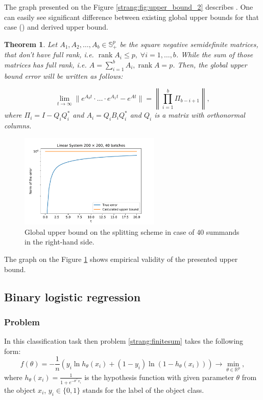\documentclass{article}
\newtheorem{theorem}{Theorem}
\begin{document}
The graph presented on the Figure \ref{strang:fig:upper_bound_2} describes . One can easily see significant difference between existing global upper bounds for that case (\cite{sheng1994global}) and derived upper bound.

\begin{theorem}\label{strang:theorem_uppbound}
	Let $A_1, A_2, \ldots, A_b \in \mathbb{S}^p_{+}$ be the square negative semidefinite matrices, that don't have full rank, i.e. $\operatorname{rank}{A_i} \leq p, \;\forall i = 1, \ldots, b$. While the sum of those matrices has full rank, i.e. $A = \sum\limits_{i=1}^b A_i, \operatorname{rank}{A} = p$. Then, the global upper bound error will be written as follows:

	\begin{equation}\label{strang:global_error_upper_bound}
		\lim_{t \to \infty}\| e^{A_bt} \cdot \ldots \cdot e^{A_1t} - e^{At}\| = \left\|\prod\limits_{i=1}^b \Pi_{b-i+1}\right\|,
	\end{equation}
	where $\Pi_i = I - Q_iQ_i^*$ and $A_i = Q_iB_iQ_i^*$ and $Q_i$ is a matrix with orthonormal columns. 
\end{theorem}

\begin{figure}[h!]
	\centering
	\includegraphics[width=0.6\textwidth]{upper_bound_many.pdf}
	\caption{Global upper bound on the splitting scheme in case of $40$ summands in the right-hand side. }
	\label{strang:fig:upper_bound_many}
\end{figure}

The graph on the Figure \ref{strang:fig:upper_bound_many} shows empirical validity of the presented upper bound.



\subsection{Binary logistic regression}
\subsubsection{Problem}
In this classification task then problem \eqref{strang:finitesum} takes the following form:
\begin{equation}\label{strang:LogReg}
   f(\theta) = -\frac{1}{n} \left(y_i \ln h_{\theta}(x_i)  + (1-y_i) \ln (1-h_{\theta}(x_i))\right) \to \min_{\theta \in \mathbb{R}^p},
\end{equation}
where $h_\theta(x_i) = \frac{1}{1 + e^{-\theta^\top x_i}}$ is the hypothesis function with given parameter $\theta$ from the object $x_i$, $ y_i \in \{0,1\}$ stands for the label of the object class.
\end{document}
